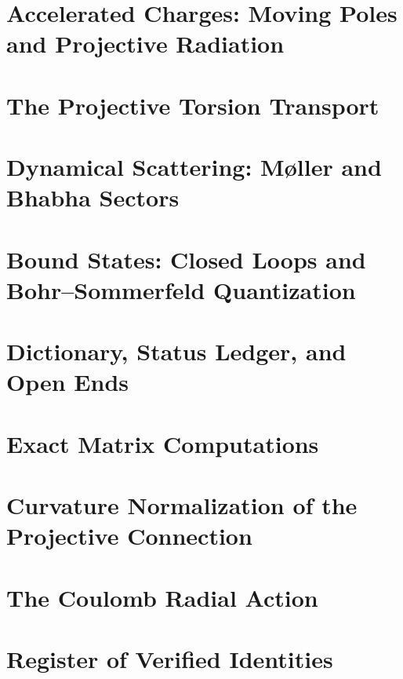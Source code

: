 \documentclass[11pt]{article}
\theoremstyle{definition}
\theoremstyle{remark}
\begin{document}
\section{Accelerated Charges: Moving Poles and Projective Radiation}
\label{sec:radiation}


\section{The Projective Torsion Transport}
\label{sec:torsion}


\section{Dynamical Scattering: M\o ller and Bhabha Sectors}
\label{sec:scattering}


\section{Bound States: Closed Loops and Bohr--Sommerfeld Quantization}
\label{sec:bohr}


\section{Dictionary, Status Ledger, and Open Ends}
\label{sec:summary}


\appendix

\section{Exact Matrix Computations}
\label{app:matrices}


\section{Curvature Normalization of the Projective Connection}
\label{app:curvature}


\section{The Coulomb Radial Action}
\label{app:action}


\section{Register of Verified Identities}
\label{app:register}

\end{document}

